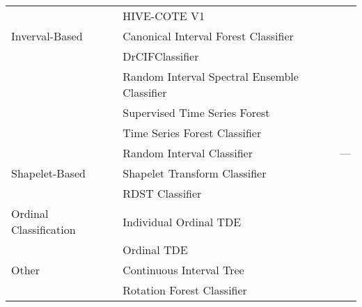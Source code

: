 \begin{table}
{\begin{tabular}{llc}
 					& HIVE-COTE V1				& \cite{HIVECOTEV2}		\\
 		Inverval-Based		& Canonical Interval Forest Classifier	& \cite{CanonicalIntervalForestClassifier}\\
 					& DrCIFClassifier			& \cite{HIVECOTEV2}		\\
 			& Random Interval Spectral Ensemble Classifier & \cite{RandomIntervalSpectralEnsembleClassifier}\\
 					& Supervised Time Series Forest		& \cite{SupervisedTimeSeriesForest}\\
 					& Time Series Forest Classifier		& \cite{TimeSeriesForestClassifier}\\
 					& Random Interval Classifier		& ---				\\
 		Shapelet-Based		& Shapelet Transform Classifier		& \cite{ShapeletTransformClassifier-1}\cite{ShapeletTransformClassifier-2}\\
 					& RDST Classifier			& \cite{RDSTClassifier-1}\cite{RDSTClassifier-2}\\
 		Ordinal Classification	& Individual Ordinal TDE		& \cite{OrdinalTDE}		\\
 					& Ordinal TDE				& \cite{OrdinalTDE}		\\
 		Other			& Continuous Interval Tree		& \cite{ContinuousIntervalTree}	\\
 					& Rotation Forest Classifier		& \cite{RotationForestClassifier}\\
		\bottomrule
	\end{tabular}
	}
	\label{tab:non_cv_list}
\end{table}
